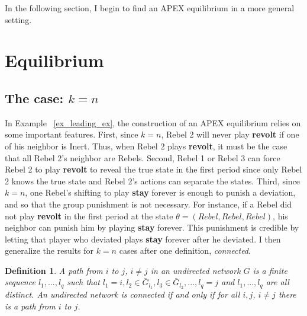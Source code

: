 \documentclass[12pt,letter]{article}
\newtheorem{definition}{Definition}[section]
\theoremstyle{definition}
\theoremstyle{remark}
\theoremstyle{claim}
\begin{document}
In the following section, I begin to find an APEX equilibrium in a more general setting.

\section{Equilibrium}
\label{sec:equilibrium}
\subsection{The case: $k=n$}

In Example ~\ref{ex_leading_ex}, the construction of an APEX equilibrium relies on some important features. First, since $k=n$, Rebel 2 will never play \textbf{revolt} if one of his neighbor is Inert. Thus, when Rebel 2 plays \textbf{revolt}, it must be the case that all Rebel 2's neighbor are Rebels.  Second, Rebel 1 or Rebel 3 can force Rebel 2 to play \textbf{revolt} to reveal the true state in the first period since only Rebel 2 knows the true state and Rebel 2's actions can separate the states. Third, since $k=n$, one Rebel's shifting to play \textbf{stay} forever is enough to punish a deviation, and so that the group punishment is not necessary. For instance, if a Rebel did not play \textbf{revolt} in the first period at the state $\theta=(Rebel,Rebel,Rebel)$, his neighbor can punish him by playing \textbf{stay} forever. This punishment is credible by letting that player who deviated plays \textbf{stay} forever after he deviated. I then generalize the results for $k=n$ cases after one definition, \textit{connected}.

\begin{definition}
A path from $i$ to $j$, $i\neq j$ in an undirected network $G$ is a finite sequence $l_1,...,l_q$ such that $l_1=i, l_2\in \bar{G}_{l_1}, l_3\in \bar{G}_{l_2},...,l_q=j$ and $l_1,...,l_q$ are all distinct. An undirected network is connected if and only if for all $i,j$, $i\neq j$ there is a path from $i$ to $j$. 
\end{definition}
\end{document}
